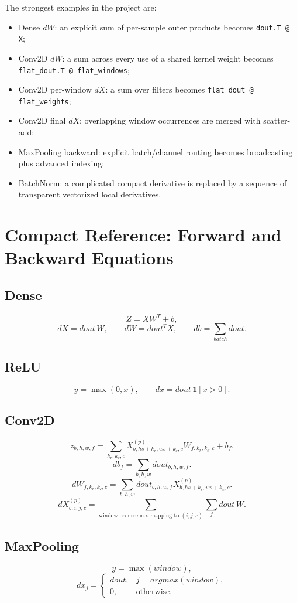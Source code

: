 \documentclass[11pt,a4paper]{article}
\newcommand{\code}[1]{\texttt{#1}}
\begin{document}
The strongest examples in the project are:
\begin{itemize}
    \item Dense $dW$: an explicit sum of per-sample outer products becomes \code{dout.T @ X};
    \item Conv2D $dW$: a sum across every use of a shared kernel weight becomes \code{flat\_dout.T @ flat\_windows};
    \item Conv2D per-window $dX$: a sum over filters becomes \code{flat\_dout @ flat\_weights};
    \item Conv2D final $dX$: overlapping window occurrences are merged with scatter-add;
    \item MaxPooling backward: explicit batch/channel routing becomes broadcasting plus advanced indexing;
    \item BatchNorm: a complicated compact derivative is replaced by a sequence of transparent vectorized local derivatives.
\end{itemize}

\section{Compact Reference: Forward and Backward Equations}

\subsection{Dense}
\[
Z=XW^T+b,
\]
\[
dX=dout\,W,
\qquad
dW=dout^TX,
\qquad
db=\sum_{batch}dout.
\]

\subsection{ReLU}
\[
y=\max(0,x),
\qquad
dx=dout\,\mathbf{1}[x>0].
\]

\subsection{Conv2D}
\[
z_{b,h,w,f}
=
\sum_{k_r,k_c,c}
X^{(p)}_{b,hs+k_r,ws+k_c,c}
W_{f,k_r,k_c,c}+b_f.
\]
\[
db_f=\sum_{b,h,w}dout_{b,h,w,f}.
\]
\[
dW_{f,k_r,k_c,c}
=
\sum_{b,h,w}
dout_{b,h,w,f}
X^{(p)}_{b,hs+k_r,ws+k_c,c}.
\]
\[
dX^{(p)}_{b,i,j,c}
=
\sum_{\text{window occurrences mapping to }(i,j,c)}
\sum_f dout\,W.
\]

\subsection{MaxPooling}
\[
y=\max(window),
\]
\[
dx_j=
\begin{cases}
dout,&j=argmax(window),\\0,&\text{otherwise}.
\end{cases}
\]
\end{document}
